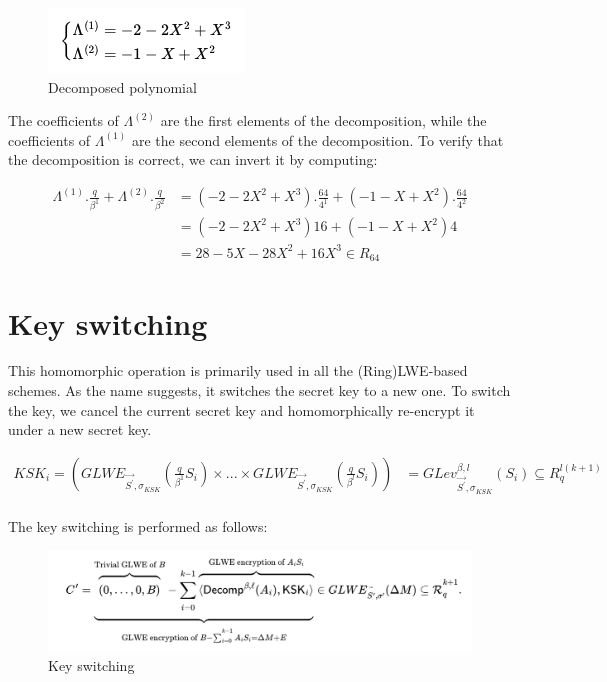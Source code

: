 \documentclass{techrep}
\theoremstyle{definition}
\theoremstyle{plain}
\begin{document}
	\begin{figure}[H]
		\centering
	\includegraphics[width=.4\columnwidth]{fig/decomp_poly.png}
		\caption{Decomposed polynomial}
		\label{fig:decomposed_polyn}
	\end{figure}

The coefficients of $\Lambda^{(2)}$ are the first elements of the decomposition, while the coefficients of $\Lambda^{(1)}$ are the second elements of the decomposition. To verify that the decomposition is correct, we can invert it by computing:

	\begin{align*}
\Lambda^{(1)}.\frac{q}{\beta^1}	+ \Lambda^{(2)}.\frac{q}{\beta^2}	&=	  (-2-2X^2+X^3).\frac{64}{4^1}	+ (-1-X+X^2).\frac{64}{4^2} \\
 &= (-2-2X^2+X^3)16	+ (-1-X+X^2)4 \\
                 &= 28 - 5X - 28X^2+16X^3 \in R_{64}
	\end{align*}


\section{Key switching}
This homomorphic operation is primarily used in all the (Ring)LWE-based schemes. As the name suggests, it switches the secret key to a new one. To switch the key, we cancel the current secret key and homomorphically re-encrypt it under a new secret key. 

		\begin{align*}
{KSK}_i = (GLWE_{\overrightarrow{S^{'}},\sigma_{KSK}}(\frac{q}{\beta^1} S_i) \times ... \times GLWE_{\overrightarrow{S^{'}},\sigma_{KSK}}(\frac{q}{\beta^l} S_i))	&=	{GLev}_{\overrightarrow{S^{'}}, \sigma_{KSK}}^{\beta, l}(S_i)  \subseteq  R_{q}^{l{(k+1)}}  \\
	\end{align*}
	

The key switching is performed as follows:

	\begin{figure}[H]
		\centering
	\includegraphics[width=1\columnwidth]{fig/ksk.png}
		\caption{Key switching}
		\label{fig:ksk}
	\end{figure}
\end{document}
